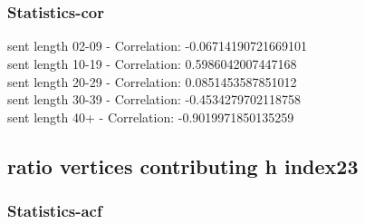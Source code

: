 \documentclass{article}%
\begin{document}
\begin{figure}[ht]%
\centering%
\setlength{\abovecaptionskip}{-35pt}%
%
%
\\%
%
%
\\%
%
\end{figure}

%
\newpage%
\subsubsection{Statistics{-}cor}%
\label{ssubsec:Statistics{-}cor}%
\noindent%
sent length 02-09 - Correlation: -0.06714190721669101\\%
sent length 10-19 - Correlation: 0.5986042007447168\\%
sent length 20-29 - Correlation: 0.0851453587851012\\%
sent length 30-39 - Correlation: -0.4534279702118758\\%
sent length 40+ - Correlation: -0.9019971850135259\\

%
\newpage

%
\subsection{ratio vertices contributing h index23}%
\label{subsec:ratioverticescontributinghindex23}%
\subsubsection{Statistics{-}acf}%
\label{ssubsec:Statistics{-}acf}%
\end{document}
